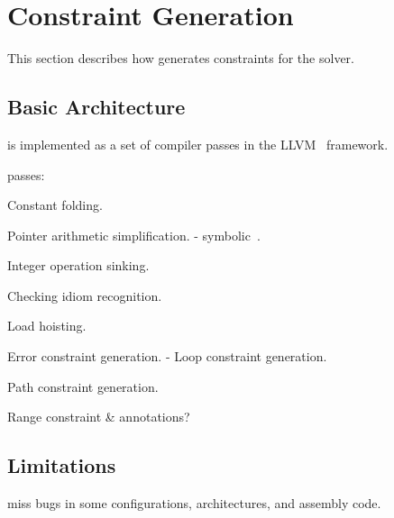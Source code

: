 \section{Constraint Generation}
\label{s:gen}

This section describes how \sys generates constraints for the solver.

\subsection{Basic Architecture}

\sys is implemented as a set of compiler passes in the
LLVM~\cite{lattner:llvm} framework.


passes:


Constant folding.

Pointer arithmetic simplification.
- symbolic~\cite{engelen:symbolic}.

Integer operation sinking.

Checking idiom recognition.

Load hoisting.

Error constraint generation.
- Loop constraint generation.

Path constraint generation.

Range constraint \& annotations?

\subsection{Limitations}

miss bugs in some configurations, architectures,
and assembly code.
